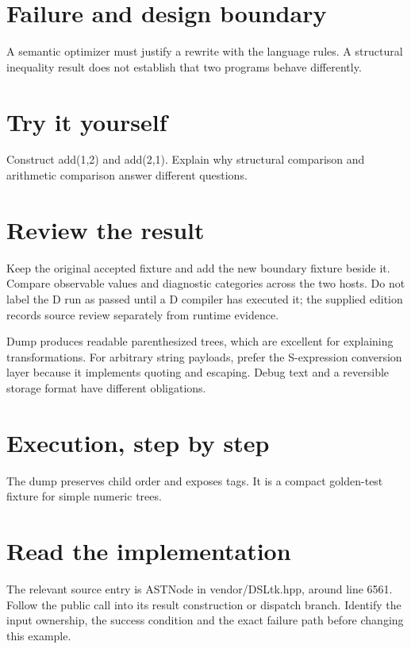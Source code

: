 
\section*{Failure and design boundary}
A semantic optimizer must justify a rewrite with the language rules. A structural inequality result does not establish that two programs behave differently.

\section*{Try it yourself}
Construct add(1,2) and add(2,1). Explain why structural comparison and arithmetic comparison answer different questions.

\section*{Review the result}
Keep the original accepted fixture and add the new boundary fixture beside it. Compare observable values and diagnostic categories across the two hosts. Do not label the D run as passed until a D compiler has executed it; the supplied edition records source review separately from runtime evidence.

\clearpage
{}
Dump produces readable parenthesized trees, which are excellent for explaining transformations. For arbitrary string payloads, prefer the S-expression conversion layer because it implements quoting and escaping. Debug text and a reversible storage format have different obligations.


\section*{Execution, step by step}
The dump preserves child order and exposes tags. It is a compact golden-test fixture for simple numeric trees.

\section*{Read the implementation}
The relevant source entry is ASTNode in vendor/DSLtk.hpp, around line 6561. Follow the public call into its result construction or dispatch branch. Identify the input ownership, the success condition and the exact failure path before changing this example.

